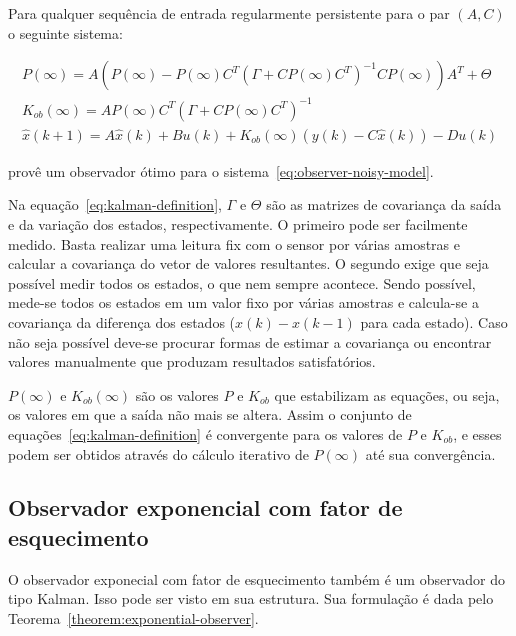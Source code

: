 \begin{theorem}%
	\label{theorem:kalman}
	Para qualquer sequência de entrada regularmente persistente para o par \(
	(A, C) \) o seguinte sistema:

	\begin{equation}
		\label{eq:kalman-definition}
		\begin{split}
			P(\infty)=A(P(\infty)-P(\infty)C^T{(\Gamma+CP(\infty)C^T)}^{-1}CP(\infty))A^T+\Theta \\
			K_{ob}(\infty)=AP(\infty)C^T{(\Gamma+CP(\infty)C^T)}^{-1} \\
			\hat{x}(k+1) = A\hat{x}(k) + Bu(k) + K_{ob}(\infty)(y(k) - C\hat{x}(k))-Du(k)
		\end{split}
	\end{equation}

	provê um observador  ótimo para o sistema~\eqref{eq:observer-noisy-model}.
\end{theorem}

Na equação~\eqref{eq:kalman-definition}, \( \Gamma \) e \( \Theta \) são as
matrizes de covariança da saída e da variação dos estados, respectivamente. O
primeiro pode ser facilmente medido. Basta realizar uma leitura fix com o sensor
por várias amostras e calcular a covariança do vetor de valores resultantes. O
segundo exige que seja possível medir todos os estados, o que nem sempre
acontece. Sendo possível, mede-se todos os estados em um valor fixo por várias
amostras e calcula-se a covariança da diferença dos estados (\( x(k) - x(k-1) \)
para cada estado). Caso não seja possível deve-se procurar formas de estimar a
covariança ou encontrar valores manualmente que produzam resultados
satisfatórios.

\( P(\infty) \) e \( K_{ob}(\infty) \) são os valores \( P \) e \( K_{ob} \) que
estabilizam as equações, ou seja, os valores em que a saída não mais se altera.
Assim o conjunto de equações~\eqref{eq:kalman-definition} é convergente para os
valores de \( P \) e \( K_{ob} \), e esses podem ser obtidos através do cálculo
iterativo de \( P(\infty) \) até sua convergência.

\subsection{Observador exponencial com fator de esquecimento}%
\label{subsec:exponential-observer}

O observador exponecial com fator de esquecimento\cite{Ticlea2009} também é um
observador do tipo Kalman. Isso pode ser visto em sua estrutura. Sua formulação
é dada pelo Teorema~\ref{theorem:exponential-observer}.

